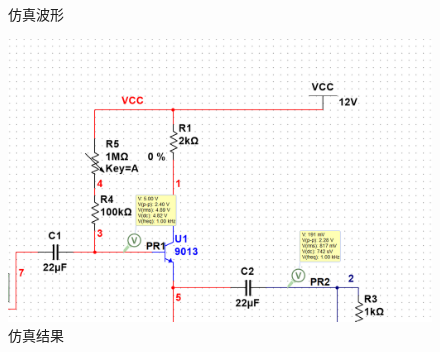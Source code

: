 \documentclass[a4paper,10pt,notitlepage]{article}
\begin{document}
\begin{figure}[h]
\begin{minipage}{0.28\textwidth}
			\caption*{仿真波形}
		\end{minipage}
		\qquad
		\begin{minipage}{0.28\textwidth}
			\centering
			\includegraphics[width=\textwidth]{5-1.png}
			\caption*{仿真结果}
		\end{minipage}
	\end{figure}
\end{document}

